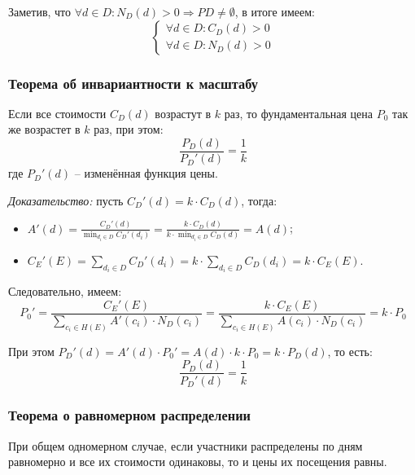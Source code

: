 Заметив, что $\forall d \in D: N_D(d) > 0 \Rightarrow PD \ne \emptyset$, в итоге имеем:
\begin{equation}
	\begin{cases}
		\forall d \in D: C_D(d) > 0 \\
		\forall d \in D: N_D(d) > 0
	\end{cases}
\end{equation}

\subsubsection{Теорема об инвариантности к масштабу}

Если все стоимости $C_D(d)$ возрастут в $k$ раз, то фундаментальная цена $P_0$ так же возрастет в $k$ раз, при этом:
\begin{equation}
	\frac{P_D(d)}{P_D'(d)} = \frac{1}{k}
\end{equation}
где $P_D'(d)$ -- изменённая функция цены.

\textit{Доказательство:} пусть $C_D'(d) = k \cdot C_D(d)$, тогда:
\begin{itemize}[label=--]
	\item $A'(d) = \frac{C_D'(d)}{\min_{d_i \in D}{C_D'(d_i)}} = \frac{k \cdot C_D(d)}{k \cdot \min_{d_i \in D}{C_D(d)}} = A(d)$;
	\item $C_E'(E) = \sum_{d_i \in D}{C_D'(d_i)} = k \cdot \sum_{d_i \in D}{C_D(d_i)} = k \cdot C_E(E)$.
\end{itemize}

Следовательно, имеем:
\begin{equation}
	P_0' = \frac{C_E'(E)}{\sum_{c_i \in H(E)}{A'(c_i) \cdot N_D(c_i)}} = \frac{k \cdot C_E(E)}{\sum_{c_i \in H(E)}{A(c_i) \cdot N_D(c_i)}} = k \cdot P_0
\end{equation}

При этом $P_D'(d) = A'(d) \cdot P_0' = A(d) \cdot k \cdot P_0 = k \cdot P_D(d)$, то есть:
\begin{equation}
	\frac{P_D(d)}{P_D'(d)} = \frac{1}{k}
\end{equation}

\subsubsection{Теорема о равномерном распределении}

При общем одномерном случае, если участники распределены по дням равномерно и все их стоимости одинаковы, то и цены их посещения равны.

